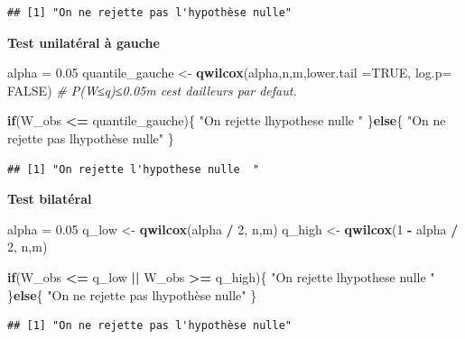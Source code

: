 \documentclass[
  12pt,
]{article}
\newenvironment{Shaded}{\begin{snugshade}}{\end{snugshade}}
\newcommand{\AttributeTok}[1]{\textcolor[rgb]{0.13,0.29,0.53}{#1}}
\newcommand{\CommentTok}[1]{\textcolor[rgb]{0.56,0.35,0.01}{\textit{#1}}}
\newcommand{\ConstantTok}[1]{\textcolor[rgb]{0.56,0.35,0.01}{#1}}
\newcommand{\ControlFlowTok}[1]{\textcolor[rgb]{0.13,0.29,0.53}{\textbf{#1}}}
\newcommand{\DecValTok}[1]{\textcolor[rgb]{0.00,0.00,0.81}{#1}}
\newcommand{\FloatTok}[1]{\textcolor[rgb]{0.00,0.00,0.81}{#1}}
\newcommand{\FunctionTok}[1]{\textcolor[rgb]{0.13,0.29,0.53}{\textbf{#1}}}
\newcommand{\NormalTok}[1]{#1}
\newcommand{\OtherTok}[1]{\textcolor[rgb]{0.56,0.35,0.01}{#1}}
\newcommand{\SpecialCharTok}[1]{\textcolor[rgb]{0.81,0.36,0.00}{\textbf{#1}}}
\newcommand{\StringTok}[1]{\textcolor[rgb]{0.31,0.60,0.02}{#1}}
\begin{document}
\begin{verbatim}
## [1] "On ne rejette pas l'hypothèse nulle"
\end{verbatim}

\textbf{Test unilatéral à gauche}

\begin{Shaded}
\begin{Highlighting}[]
\NormalTok{alpha }\OtherTok{=} \FloatTok{0.05}
\NormalTok{quantile\_gauche }\OtherTok{\textless{}{-}} \FunctionTok{qwilcox}\NormalTok{(alpha,n,m,}\AttributeTok{lower.tail =}\ConstantTok{TRUE}\NormalTok{, }\AttributeTok{log.p=} \ConstantTok{FALSE}\NormalTok{) }
\CommentTok{\# P(W≤q)≤0.05m c\textquotesingle{}est d\textquotesingle{}ailleurs par defaut.}
 
\ControlFlowTok{if}\NormalTok{(W\_obs }\SpecialCharTok{\textless{}=}\NormalTok{ quantile\_gauche)\{}
\StringTok{"On rejette l\textquotesingle{}hypothese nulle  "}
\NormalTok{\}}\ControlFlowTok{else}\NormalTok{\{}
\StringTok{"On ne rejette pas l\textquotesingle{}hypothèse nulle"}
\NormalTok{\}}
\end{Highlighting}
\end{Shaded}

\begin{verbatim}
## [1] "On rejette l'hypothese nulle  "
\end{verbatim}

\textbf{Test bilatéral}

\begin{Shaded}
\begin{Highlighting}[]
\NormalTok{alpha }\OtherTok{=} \FloatTok{0.05}
\NormalTok{q\_low }\OtherTok{\textless{}{-}} \FunctionTok{qwilcox}\NormalTok{(alpha }\SpecialCharTok{/} \DecValTok{2}\NormalTok{, n,m)}
\NormalTok{q\_high }\OtherTok{\textless{}{-}} \FunctionTok{qwilcox}\NormalTok{(}\DecValTok{1} \SpecialCharTok{{-}}\NormalTok{ alpha }\SpecialCharTok{/} \DecValTok{2}\NormalTok{, n,m)}

\ControlFlowTok{if}\NormalTok{(W\_obs }\SpecialCharTok{\textless{}=}\NormalTok{ q\_low }\SpecialCharTok{||}\NormalTok{ W\_obs }\SpecialCharTok{\textgreater{}=}\NormalTok{ q\_high)\{}
\StringTok{"On rejette l\textquotesingle{}hypothese nulle  "}
\NormalTok{\}}\ControlFlowTok{else}\NormalTok{\{}
\StringTok{"On ne rejette pas l\textquotesingle{}hypothèse nulle"}
\NormalTok{\}}
\end{Highlighting}
\end{Shaded}

\begin{verbatim}
## [1] "On ne rejette pas l'hypothèse nulle"
\end{verbatim}
\end{document}
